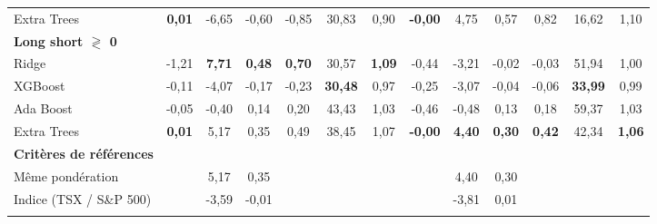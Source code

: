 \begin{table}[h]
{\begin{tabular}{l *{6}{S[table-format=3.2]} | *{6}{S[table-format=3.2]}}
Extra Trees & \bfseries\color{Green}0,01 & -6,65 & -0,60 & -0,85 & 30,83 & 0,90 & \bfseries\color{Green}-0,00 & 4,75 & 0,57 & 0,82 & 16,62 & 1,10 \\ \addlinespace[0.1cm]
\textbf{Long short $\gtrless$ 0} &  &  &  &  &  &  &  &  &  &  &  & \\
\addlinespace[0.1cm]
Ridge & -1,21 & \bfseries\color{Green}7,71 & \bfseries\color{Green}0,48 & \bfseries\color{Green}0,70 & 30,57 & \bfseries\color{Green}1,09 & -0,44 & -3,21 & -0,02 & -0,03 & 51,94 & 1,00 \\ \addlinespace[0.1cm]
XGBoost & -0,11 & -4,07 & -0,17 & -0,23 & \bfseries\color{Green}30,48 & 0,97 & -0,25 & -3,07 & -0,04 & -0,06 & \bfseries\color{Green}33,99 & 0,99 \\ \addlinespace[0.1cm]
Ada Boost & -0,05 & -0,40 & 0,14 & 0,20 & 43,43 & 1,03 & -0,46 & -0,48 & 0,13 & 0,18 & 59,37 & 1,03 \\ \addlinespace[0.1cm]
Extra Trees & \bfseries\color{Green}0,01 & 5,17 & 0,35 & 0,49 & 38,45 & 1,07 & \bfseries\color{Green}-0,00 & \bfseries\color{Green}4,40 & \bfseries\color{Green}0,30 & \bfseries\color{Green}0,42 & 42,34 & \bfseries\color{Green}1,06 \\ \addlinespace[0.1cm]
\textbf{Critères de références} &  &  &  &  &  &  &  &  &  &  &  & \\
\addlinespace[0.1cm]
Même pondération &  & 5,17 & 0,35 &  &  &  &  & 4,40 & 0,30 &  &  &  \\ \addlinespace[0.1cm]
Indice (TSX / S\&P 500) &  & -3,59 & -0,01 &  &  &  &  & -3,81 & 0,01 &  &  &  \\ \addlinespace[0.1cm]
\bottomrule
\end{tabular}}
\end{table}
